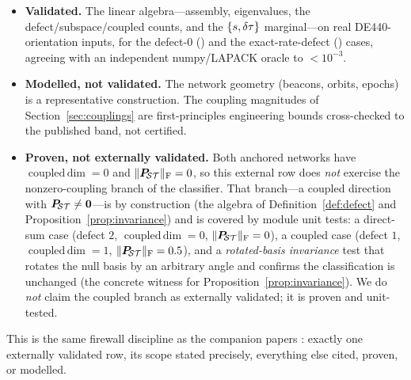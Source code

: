 \begin{itemize}
  \item \textbf{Validated.} The linear algebra---assembly, eigenvalues, the
  defect/subspace/coupled counts, and the $\{s,\delta\tau\}$ marginal---on real
  DE440-orientation inputs, for the defect-$0$ () and the
  exact-rate-defect () cases, agreeing with an independent numpy/LAPACK
  oracle to $<10^{-3}$.

  \item \textbf{Modelled, not validated.} The network geometry (beacons, orbits, epochs) is
  a representative construction. The coupling magnitudes of Section~\ref{sec:couplings} are
  first-principles engineering bounds cross-checked to the published band, not certified.

  \item \textbf{Proven, not externally validated.} Both anchored networks have
  $\operatorname{coupled\,dim}=0$ and $\lVert\bm{P}_{\!\mathcal{S}\mathcal{T}}\rVert_{\mathrm F}=0$, so this external row
  does \emph{not} exercise the nonzero-coupling branch of the classifier. That branch---a
  coupled direction with $\bm{P}_{\!\mathcal{S}\mathcal{T}}\neq\bm0$---is \Proven{} by construction (the algebra of
  Definition~\ref{def:defect} and Proposition~\ref{prop:invariance}) and is covered by
  module unit tests: a direct-sum case (defect $2$, $\operatorname{coupled\,dim}=0$,
  $\lVert\bm{P}_{\!\mathcal{S}\mathcal{T}}\rVert_{\mathrm F}=0$), a coupled case (defect $1$,
  $\operatorname{coupled\,dim}=1$, $\lVert\bm{P}_{\!\mathcal{S}\mathcal{T}}\rVert_{\mathrm F}=0.5$), and a
  \emph{rotated-basis invariance} test that rotates the null basis by an arbitrary angle and
  confirms the classification is unchanged (the concrete witness for
  Proposition~\ref{prop:invariance}). We do \emph{not} claim the coupled branch as
  externally validated; it is proven and unit-tested.
\end{itemize}

This is the same firewall discipline as the companion papers
\citep{baweja2026datum,baweja2026commonmode}: exactly one externally validated row, its
scope stated precisely, everything else cited, proven, or modelled.
